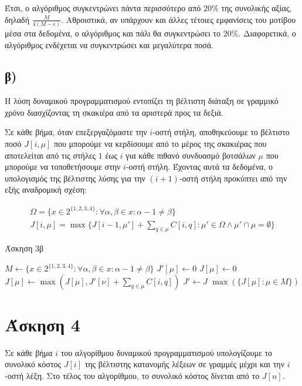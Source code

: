 \documentclass[11pt,a4paper]{book}
\begin{document}
Έτσι, ο αλγόριθμος συγκεντρώνει πάντα περισσότερο από $20\%$ της συνολικής αξίας, δηλαδή $\frac{M}{4(M - \epsilon)}$. Αθροιστικά, αν υπάρχουν και άλλες τέτοιες εμφανίσεις του μοτίβου μέσα στα δεδομένα, ο αλγόριθμος και πάλι θα συγκεντρώσει το $20\%$. Διαφορετικά, ο αλγόριθμος ενδέχεται να συγκεντρώσει και μεγαλύτερα ποσά.

\subsection*{β)}
Η λύση δυναμικού προγραμματισμού εντοπίζει τη βέλτιστη διάταξη σε γραμμικό χρόνο διασχίζοντας τη σκακιέρα από τα αριστερά προς τα δεξιά.

Σε κάθε βήμα, όταν επεξεργαζόμαστε την $i$-οστή στήλη, αποθηκεύουμε το βέλτιστο ποσό $J[ i, \mu ]$ που μπορούμε να κερδίσουμε από το μέρος της σκακιέρας που αποτελείται από τις στήλες $1$ έως $i$ για κάθε πιθανό συνδυασμό βοτσάλων $\mu$ που μπορούμε να τοποθετήσουμε στην $i$-οστή στήλη. Έχοντας αυτά τα δεδομένα, ο υπολογισμός της βέλτιστης λύσης για την $(i + 1)$-οστή στήλη προκύπτει από την εξής αναδρομική σχέση:

\begin{align*}
	\Omega = \{ x \in 2^{\{1, 2, 3, 4\}}: \forall \alpha, \beta \in x: \alpha - 1 \neq \beta \}\\
	J[ i, \mu ] = \max\{J[ i - 1, \mu' ] + \sum_{q \in \mu}{C[ i, q ]}: \mu' \in \Omega \land \mu' \cap \mu = \emptyset\}
\end{align*}



\begin{algorithm}[H]
\caption{\textgreek{Άσκηση 3β}}
\begin{algorithmic}[1]
	\State $M \gets \{ x \in 2^{\{1, 2, 3, 4\}}: \forall \alpha, \beta \in x: \alpha - 1 \neq \beta \}$
		\State $J'[ \mu ] \gets 0$
	\EndFor
			\State $J[ \mu ] \gets 0$
				\If {$\nu \cap \mu = \emptyset$}
					\State $J[ \mu ] \gets \max( J[ \mu ], J'[ \nu ] + \sum_{q \in \mu}{C[ i, q ]} )$
				\EndIf
			\EndFor
		\EndFor
		\State $J' \gets J$
	\EndFor
	\State \Return $\max( \{ J[ \mu ]: \mu \in M \} )$
\EndProcedure
\end{algorithmic}
\end{algorithm}

\section*{Άσκηση 4}
Σε κάθε βήμα $i$ του αλγορίθμου δυναμικού προγραμματισμού υπολογίζουμε το συνολικό κόστος $J[ i ]$ της βέλτιστης κατανομής λέξεων σε γραμμές μέχρι και την $i$-οστή λέξη. Στο τέλος του αλγορίθμου, το συνολικό κόστος δίνεται από το $J[ n ]$.
\end{document}

